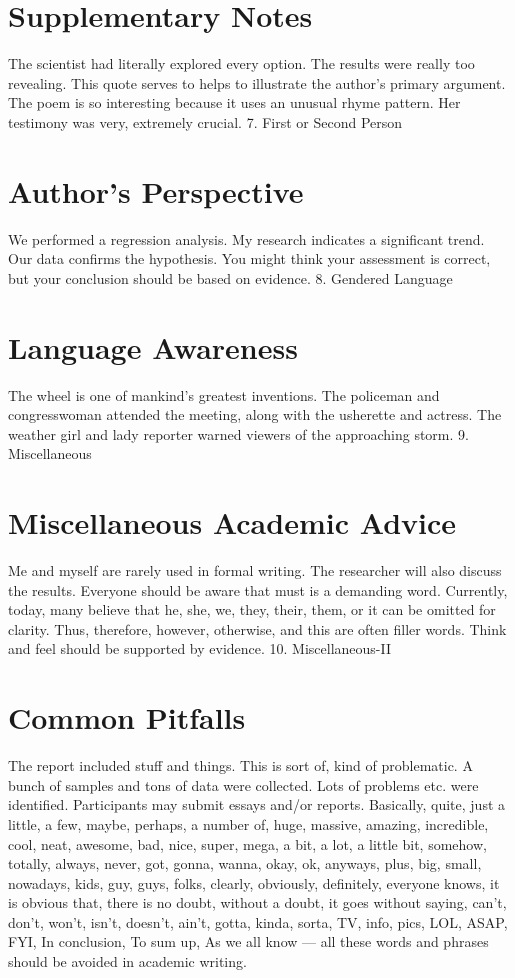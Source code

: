 \section{Supplementary Notes}
The scientist had literally explored every option. The results were really too revealing. This quote serves to helps to illustrate the author’s primary argument. The poem is so interesting because it uses an unusual rhyme pattern. Her testimony was very, extremely crucial.
7. First or Second Person
\section{Author's Perspective}
We performed a regression analysis. My research indicates a significant trend. Our data confirms the hypothesis. You might think your assessment is correct, but your conclusion should be based on evidence.
8. Gendered Language
\section{Language Awareness}
The wheel is one of mankind’s greatest inventions. The policeman and congresswoman attended the meeting, along with the usherette and actress. The weather girl and lady reporter warned viewers of the approaching storm.
9. Miscellaneous
\section{Miscellaneous Academic Advice}
Me and myself are rarely used in formal writing. The researcher will also discuss the results. Everyone should be aware that must is a demanding word. Currently, today, many believe that he, she, we, they, their, them, or it can be omitted for clarity. Thus, therefore, however, otherwise, and this are often filler words. Think and feel should be supported by evidence.
10. Miscellaneous-II
\section{Common Pitfalls}
The report included stuff and things. This is sort of, kind of problematic. A bunch of samples and tons of data were collected. Lots of problems etc. were identified. Participants may submit essays and/or reports. Basically, quite, just a little, a few, maybe, perhaps, a number of, huge, massive, amazing, incredible, cool, neat, awesome, bad, nice, super, mega, a bit, a lot, a little bit, somehow, totally, always, never, got, gonna, wanna, okay, ok, anyways, plus, big, small, nowadays, kids, guy, guys, folks, clearly, obviously, definitely, everyone knows, it is obvious that, there is no doubt, without a doubt, it goes without saying, can't, don't, won't, isn't, doesn't, ain't, gotta, kinda, sorta, TV, info, pics, LOL, ASAP, FYI, In conclusion, To sum up, As we all know — all these words and phrases should be avoided in academic writing.